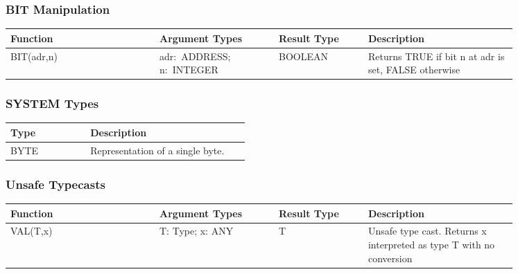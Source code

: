 \documentclass[a4wide,11pt]{article}
\begin{document}
\subsubsection{BIT Manipulation}
\begin{longtable}{|p{0.25\linewidth}|p{0.2\linewidth}|p{0.15\linewidth}|p{0.25\linewidth}|}

\hline
Function & Argument Types & Result Type & Description \\
\hline\hline
\endhead
BIT(adr,n) & adr:~ADDRESS; n:~INTEGER & BOOLEAN & Returns TRUE if bit n at adr is set, FALSE otherwise \\
\hline
\end{longtable}

\subsubsection{SYSTEM Types}
\begin{longtable}{|p{0.3\linewidth}|p{0.6\linewidth}|}
\hline
Type & Description \\
\hline\hline
\endhead
BYTE & Representation of a single byte.\\
\hline
\end{longtable}

\subsubsection{Unsafe Typecasts}
\begin{longtable}{|p{0.25\linewidth}|p{0.2\linewidth}|p{0.15\linewidth}|p{0.25\linewidth}|}

\hline
Function & Argument Types & Result Type & Description \\
\hline\hline
\endhead
VAL(T,x) & T: Type; x: ANY & T & Unsafe type cast. Returns x interpreted as type T with no conversion \\
\hline
\end{longtable}
\end{document}

